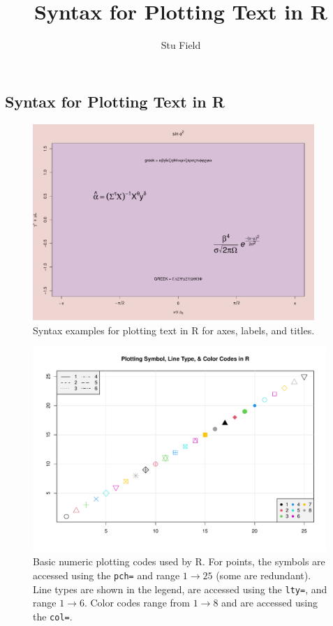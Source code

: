 \documentclass[11pt]{article}
\title{\textsf{Syntax for Plotting Text in R}}
\author{Stu Field}
\newcommand{\code}[1]{\texttt{#1}}                      %
\begin{document}
\begin{center}
  \section*{\textsf{Syntax for Plotting Text in R}}
\end{center}

\begin{figure}[H]
\centering
\abovecaptionskip=0pt
\includegraphics[width=0.95\textwidth]{fig1-symb}
\caption{Syntax examples for plotting text in \textsf{R} for axes, labels, and
  titles.}
\end{figure}

\begin{myverb}
  
\end{myverb}

\begin{figure}[H]
\centering
\abovecaptionskip=-1cm
\includegraphics[width=0.99\textwidth]{fig2-pch-symb}
\caption{Basic numeric plotting codes used by \textsf{R}.
  For points, the symbols are accessed using the \code{pch=} and range
  $1 \to 25$ (some are redundant). Line types are shown in the legend, are
  accessed using the \code{lty=}, and range $1 \to 6$. Color codes range
  from $1 \to 8$ and are accessed using the
  \code{col=}. \label{fig:pchsymbols}}
\end{figure}


\begin{myverb}
  
\end{myverb}
\end{document}
